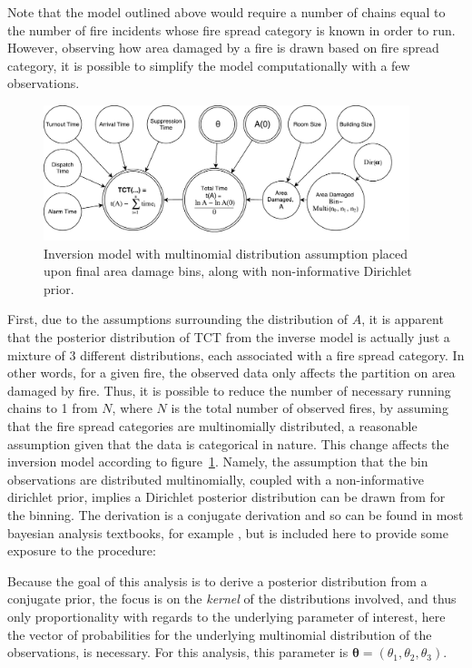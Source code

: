 \documentclass[12pt,oneside]{book}
\begin{document}
Note that the model outlined above would require a number of chains equal to the number of fire incidents whose fire spread category is known in order to run. However, observing how area damaged by a fire is drawn based on fire spread category, it is possible to simplify the model computationally with a few observations.

\begin{figure}[htb]
  \centering
  \includegraphics[width=0.95\textwidth]{./Figures/TCTinversemulti}
  \caption{Inversion model with multinomial distribution assumption placed upon final area damage bins, along with non-informative Dirichlet prior.}
  \label{fig:TCTinversemulti}
\end{figure}

First, due to the assumptions surrounding the distribution of $A$, it is apparent that the posterior distribution of TCT from the inverse model is actually just a mixture of 3 different distributions, each associated with a fire spread category. In other words, for a given fire, the observed data only affects the partition on area damaged by fire. Thus, it is possible to reduce the number of necessary running chains to 1 from $N$, where $N$ is the total number of observed fires, by assuming that the fire spread categories are multinomially distributed, a reasonable assumption given that the data is categorical in nature. This change affects the inversion model according to figure~\ref{fig:TCTinversemulti}. Namely, the assumption that the bin observations are distributed multinomially, coupled with a non-informative dirichlet prior, implies a Dirichlet posterior distribution can be drawn from for the binning. The derivation is a conjugate derivation and so can be found in most bayesian analysis textbooks, for example \cite{Gelman2013}, but is included here to provide some exposure to the procedure:

Because the goal of this analysis is to derive a posterior distribution from a conjugate prior, the focus is on the \emph{kernel} of the distributions involved, and thus only proportionality with regards to the underlying parameter of interest, here the vector of probabilities for the underlying multinomial distribution of the observations, is necessary. For this analysis, this parameter is $\mathbf{\theta}=(\theta_1,\theta_2,\theta_3)$.
\end{document}
